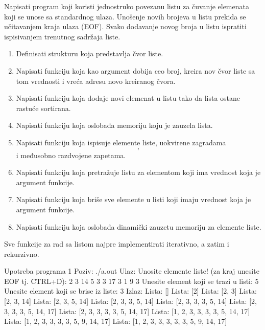 \begin{Answer}[ref=602]
\end{Answer}





\begin{Exercise}[label=603]
Napisati program koji koristi jednostruko povezanu listu za čuvanje elemenata koji se unose sa standardnog ulaza. 
Unošenje novih brojeva u listu prekida se učitavanjem kraja ulaza (EOF). 
Svako dodavanje novog broja u listu ispratiti ispisivanjem trenutnog sadržaja liste. 
\begin{enumerate}
\item Definisati strukturu  koja predstavlja čvor liste.
\item Napisati funkciju koja kao argument dobija ceo broj, kreira nov čvor liste sa tom vrednosti i vreća adresu novo kreiranog čvora.
 \item Napisati funkciju koja dodaje novi elemenat u listu tako da lista ostane rastuće sortirana.
 \item Napisati funkciju koja oslobađa memoriju koju je zauzela lista.
 \item Napisati funkciju koja ispisuje elemente liste, uokvirene zagradama \[, \] i međusobno razdvojene zapetama.
 \item Napisati funkciju koja pretražuje listu za elementom koji ima vrednost koja je argument funkcije.
 \item Napisati funkciju koja briše sve elemente u listi koji imaju vrednost koja je argument funkcije.
 \item Napisati funkciju koja oslobađa dinamički zauzetu memoriju za elemente liste.
 \end{enumerate}

 Sve funkcije za rad sa listom najpre implementirati iterativno, a zatim i rekurzivno.



\begin{maxitest}
\begin{test}{Upotreba programa 1}
Poziv: ./a.out
Ulaz:
	Unosite elemente liste! (za kraj unesite EOF tj. CTRL+D): 2 3 14 5 3 3 17 3 1 9 3
	Unesite element koji se trazi u listi: 5
	Unesite element koji se brise iz liste: 3
Izlaz:
        Lista: []
        Lista: [2]
        Lista: [2, 3]
        Lista: [2, 3, 14]
        Lista: [2, 3, 5, 14]
        Lista: [2, 3, 3, 5, 14]
        Lista: [2, 3, 3, 3, 5, 14]
        Lista: [2, 3, 3, 3, 5, 14, 17]
        Lista: [2, 3, 3, 3, 3, 5, 14, 17]
        Lista: [1, 2, 3, 3, 3, 3, 5, 14, 17]
        Lista: [1, 2, 3, 3, 3, 3, 5, 9, 14, 17]
        Lista: [1, 2, 3, 3, 3, 3, 3, 5, 9, 14, 17]
        

\end{test}
\end{maxitest}
\end{Exercise}
